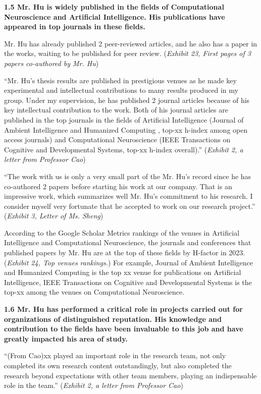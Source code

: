 \documentclass{article}
\begin{document}
{\bf 1.5 Mr. Hu is widely published in the fields of Computational Neuroscience and Artificial Intelligence. His publications have appeared in top journals in these fields.}

Mr. Hu has already published 2 peer-reviewed articles, and he also has a paper in the works, waiting to be published for peer review. ({\it Exhibit 23, First pages of 3 papers co-authored by Mr. Hu}) 

“Mr. Hu’s thesis results are published in prestigious venues as he made key experimental and intellectual contributions to many results produced in my group. Under my supervision, he has published 2 journal articles because of his key intellectual contribution to the work. Both of his journal articles are published in the top journals in the fields of Artificial Intelligence (Journal of Ambient Intelligence and Humanized Computing , top-xx h-index among open access journals) and Computational Neuroscience (IEEE Transactions on Cognitive and Developmental Systems, top-xx h-index overall).” ({\it Exhibit 2, a letter from Professor Cao}) 

“The work with us is only a very small part of the Mr. Hu’s record since he has co-authored 2 papers before starting his work at our company. That is an impressive work, which summarizes well Mr. Hu’s commitment to his research. I consider myself very fortunate that he accepted to work on our research project.” ({\it Exhibit 3, Letter of Ms. Sheng})

According to the Google Scholar Metrics rankings of the venues in Artificial Intelligence and Computational Neuroscience, the journals and conferences that published papers by Mr. Hu are at the top of these fields by H-factor in 2023. ({\it Exhibit 24, Top venues rankings.}) For example, Journal of Ambient Intelligence and Humanized Computing is the top xx venue for publications on Artificial Intelligence, IEEE Transactions on Cognitive and Developmental Systems is the top-xx among the venues on Computational Neuroscience.

{\bf 1.6 Mr. Hu has performed a critical role in projects carried out for organizations of distinguished reputation. His knowledge and contribution to the fields have been invaluable to this job and have greatly impacted his area of study. }

“(From Cao)xx played an important role in the research team, not only completed its own research content outstandingly, but also completed the research beyond expectations with other team members, playing an indispensable role in the team.” ({\it Exhibit 2, a letter from Professor Cao}) 
\end{document}

